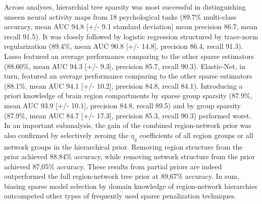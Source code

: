 \documentclass{article}
\begin{document}
Across analyses,
hierarchial tree sparsity was most successful
in distinguishing unseen neural activity maps from 18 psychological tasks
(89.7\% multi-class accuracy, mean AUC 94.8 [+/- 9.1 standard deviation]
mean precision 86.7, mean recall 91.5).
It was closely followed by logistic regression
structured by trace-norm regularization
(89.4\%, mean AUC 90.8 [+/- 14.8],
precision 86.4, recall 91.3).
Lasso featured an average performance comparing to the other sparse estimators
(88.60\%, mean AUC 94.3 [+/- 9.3],
precision 85.7, recall 90.3).
Elastic-Net, in turn, featured an
average performance comparing to the other sparse estimators
(88.1\%, mean AUC 94.1 [+/- 10.2],
precision 84.8, recall 84.1).
Introducing a priori knowledge of brain region compartments
by sparse group sparsity
(87.9\%, mean AUC 93.9 [+/- 10.1], precision 84.8, recall 89.5)
and
by group sparsity
(87.9\%, mean AUC 84.7 [+/- 17.3], precision 85.3, recall 90.3)
performed worst.
%
In an important subanalysis,
the gain of the combined region-network prior was also confirmed by
selectively zeroing the $\eta_g$ coefficients of all region groups
or all network groups in the hierarchical prior.
Removing region structure from the prior achieved
88,84\% accuracy,
while removing network structure from the prior achieved
87,05\% accuracy.
These results from partial priors are indeed outperformed
the full region-network tree prior at 89,67\% accuracy.
%
In sum,
biasing sparse model selection by domain knowledge of region-network hierarchies
outcompeted other types of frequently used sparse penalization techniques.
\end{document}
